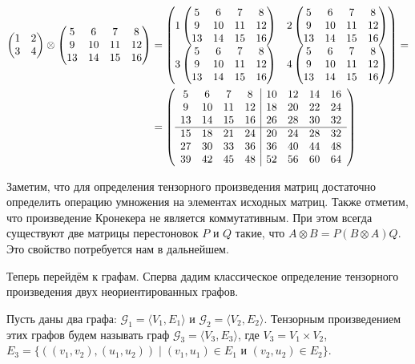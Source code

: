 
\begin{example}
\begin{align}
\begin{pmatrix}
1 & 2 \\
3 & 4
\end{pmatrix}
\otimes
\begin{pmatrix} 5 & 6 & 7 & 8 \\ 9 & 10 & 11 & 12 \\ 13 & 14 & 15 & 16 \end{pmatrix} &=
\begin{pmatrix}
1\begin{pmatrix} 5 & 6 & 7 & 8 \\ 9 & 10 & 11 & 12 \\ 13 & 14 & 15 & 16 \end{pmatrix} & 2\begin{pmatrix} 5 & 6 & 7 & 8 \\ 9 & 10 & 11 & 12 \\ 13 & 14 & 15 & 16 \end{pmatrix} \\
3\begin{pmatrix} 5 & 6 & 7 & 8 \\ 9 & 10 & 11 & 12 \\ 13 & 14 & 15 & 16 \end{pmatrix} & 4\begin{pmatrix} 5 & 6 & 7 & 8 \\ 9 & 10 & 11 & 12 \\ 13 & 14 & 15 & 16 \end{pmatrix}
\end{pmatrix}
=\notag \\
&=
\left(\begin{array}{c c c c | c c c c}
5  & 6  & 7  & 8  & 10 & 12 & 14 & 16 \\
9  & 10 & 11 & 12 & 18 & 20 & 22 & 24 \\
13 & 14 & 15 & 16 & 26 & 28 & 30 & 32 \\
\hline
15 & 18 & 21 & 24 & 20 & 24 & 28 & 32 \\
27 & 30 & 33 & 36 & 36 & 40 & 44 & 48 \\
39 & 42 & 45 & 48 & 52 & 56 & 60 & 64
\end{array}\right)
\end{align}
\end{example}

Заметим, что для определения тензорного произведения матриц достаточно определить операцию умножения на элементах исходных матриц.
Также отметим, что произведение Кронекера не является коммутативным.
При этом всегда существуют две матрицы перестоновок $P$ и $Q$ такие, что $A \otimes B = P(B \otimes A)Q$.
Это свойство потребуется нам в дальнейшем.

Теперь перейдём к графам.
Сперва дадим классическое определение тензорного произведения двух неориентированных графов.

\begin{definition}
Пусть даны два графа: $\mathcal{G}_1 = \langle V_1, E_1\rangle$ и $\mathcal{G}_2 = \langle V_2, E_2\rangle$.
Тензорным произведением этих графов будем называть граф $\mathcal{G}_3 = \langle V_3, E_3\rangle$, где $V_3 = V_1 \times V_2$, $E_3 = \{ ((v_1,v_2),(u_1,u_2)) \mid (v_1,u_1) \in E_1 \text{ и } (v_2,u_2) \in E_2 \}$.
\end{definition}

